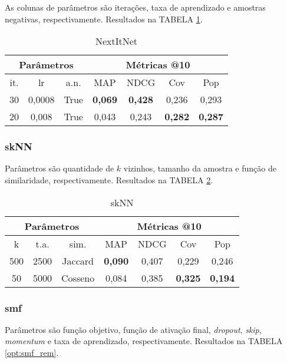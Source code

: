 As colunas de parâmetros são iterações, taxa de aprendizado e amostras
negativas, respectivamente. Resultados na TABELA \ref{opt:NextItNet_rem}.
\begin{table}[htbp]
  \centering
  \begin{tabular}{|c|c|c|c|c|c|c|}
    \hline
      \multicolumn{3}{|c|}{Parâmetros} & \multicolumn{4}{c|}{Métricas @10} \\
      \hline
      it. & lr & a.n. & MAP & NDCG & Cov & Pop \\
      \hline
      30 & 0,0008 & True & \textbf{0,069} & \textbf{0,428} & 0,236 & 0,293 \\
      \hline
      20 & 0,008 & True & 0,043 & 0,243 & \textbf{0,282} & \textbf{0,287} \\
      \hline
\end{tabular}
      \caption{NextItNet}
      \label{opt:NextItNet_rem}
\end{table}

\subsubsection{skNN}
Parâmetros são quantidade de $k$ vizinhos, tamanho da amostra e função de
similaridade, respectivamente. Resultados na TABELA \ref{opt:skNN_rem}.
\begin{table}[htbp]
  \centering
  \begin{tabular}{|c|c|c|c|c|c|c|}
    \hline
      \multicolumn{3}{|c|}{Parâmetros} & \multicolumn{4}{c|}{Métricas @10} \\
      \hline
      k & t.a. & sim. & MAP & NDCG & Cov & Pop \\
      \hline
      500 & 2500 & Jaccard & \textbf{0,090} & 0,407 & 0,229 & 0,246 \\
      \hline
      50 & 5000 & Cosseno & 0,084 & 0,385 & \textbf{0,325} & \textbf{0,194} \\
      \hline
      \end{tabular}
      \caption{skNN}
      \label{opt:skNN_rem}
\end{table}

\subsubsection{smf}
Parâmetros são função objetivo, função de ativação final, \textit{dropout},
\textit{skip}, \textit{momentum} e taxa de aprendizado, respectivamente.
Resultados na TABELA \ref{opt:smf_rem}.

